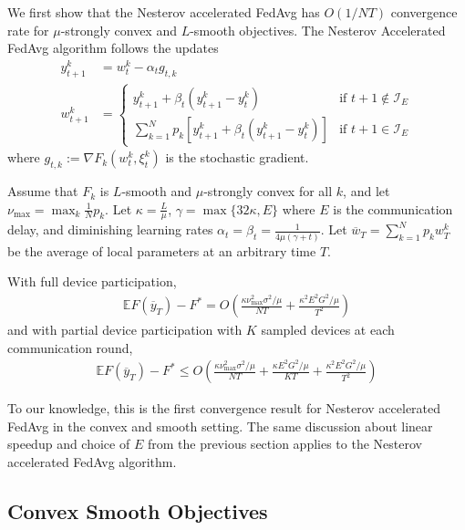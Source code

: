 We first show that the Nesterov accelerated FedAvg has $O(1/NT)$
convergence rate for $\mu$-strongly convex and $L$-smooth objectives.
The Nesterov Accelerated FedAvg algorithm follows the updates
\begin{align*}
y_{t+1}^{k} & =w_{t}^{k}-\alpha_{t}g_{t,k}\\
w_{t+1}^{k} & =\begin{cases}
y_{t+1}^{k}+\beta_{t}(y_{t+1}^{k}-y_{t}^{k}) & \text{if }t+1\notin\mathcal{I}_{E}\\
\sum_{k=1}^{N}p_{k}\left[y_{t+1}^{k}+\beta_{t}(y_{t+1}^{k}-y_{t}^{k})\right] & \text{if }t+1\in\mathcal{I}_{E}
\end{cases}
\end{align*}
where $g_{t,k}:=\nabla F_{k}(w_{t}^{k},\xi_{t}^{k})$ is the stochastic
gradient. 
\begin{theorem}
	Assume that $F_{k}$ is $L$-smooth and $\mu$-strongly convex for
	all $k$, and let $\nu_{\max}=\max_{k}\frac{1}{N}p_{k}$. Let $\kappa=\frac{L}{\mu}$,
	$\gamma=\max\{32\kappa,E\}$ where $E$ is the communication delay,
	and diminishing learning rates $\alpha_{t}=\beta_{t}=\frac{1}{4\mu(\gamma+t)}$.
	Let $\overline{w}_{T}=\sum_{k=1}^{N}p_{k}w_{T}^{k}$ be the average
	of local parameters at an arbitrary time $T$. 
	
	With full device participation, 
	\begin{align*}
	\mathbb{E}F(\overline{y}_{T})-F^{\ast}=O(\frac{\kappa\nu_{\max}^{2}\sigma^{2}/\mu}{NT}+\frac{\kappa^{2}E^{2}G^{2}/\mu}{T^{2}})
	\end{align*}
	and with partial device participation with $K$ sampled devices at
	each communication round, 
	\begin{align*}
	\mathbb{E}F(\overline{y}_{T})-F^{\ast}\leq O(\frac{\kappa\nu_{\max}^{2}\sigma^{2}/\mu}{NT}+\frac{\kappa E^{2}G^{2}/\mu}{KT}+\frac{\kappa^{2}E^{2}G^{2}/\mu}{T^{2}})
	\end{align*}
\end{theorem}
%
\begin{remark}
To our knowledge, this is the first convergence result for Nesterov accelerated FedAvg in the convex and smooth setting. The same discussion about linear speedup and choice of $E$ from the
	previous section applies to the Nesterov accelerated FedAvg algorithm. 
\end{remark}

\subsection{Convex Smooth Objectives}

